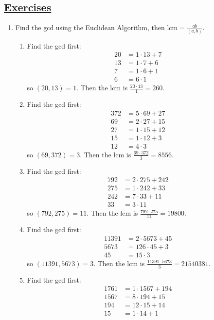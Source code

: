 \documentclass[]{article}
\begin{document}
\subsection*{\underline{Exercises}}
\begin{enumerate}
\item Find the gcd using the Euclidean Algorithm, then $\text{lcm} = \frac{ab}{(a,b)}$.
\begin{enumerate}
\item Find the gcd first:
\begin{align}
20 &= 1\cdot 13 + 7 \\
13 &= 1\cdot 7 + 6 \\
7 &= 1\cdot 6 + 1\\
6 &= 6\cdot 1
\end{align}
so $(20,13) = 1$. Then the lcm is $\frac{20\cdot 13}{1} = 260$.
\item Find the gcd first:
\begin{align}
372 &= 5\cdot 69 + 27 \\
69 &= 2\cdot 27 + 15 \\
27 &= 1\cdot 15 + 12 \\
15 &= 1\cdot 12 + 3\\
12 &= 4\cdot 3
\end{align}
so $(69,372) = 3$. Then the lcm is $\frac{69\cdot372}{3} = 8556$.
\item Find the gcd first:
\begin{align}
792 &= 2\cdot 275 + 242 \\
275 &= 1\cdot 242 + 33 \\
242 &= 7\cdot 33 + 11 \\
33 &= 3\cdot 11
\end{align}
so $(792,275) = 11$. Then the lcm is $\frac{792\cdot 275}{11} = 19800$.
\item Find the gcd first:
\begin{align}
11391 &= 2\cdot 5673 + 45 \\
5673 &= 126\cdot 45 + 3\\
45 &= 15\cdot 3
\end{align}
so $(11391,5673) = 3$. Then the lcm is $\frac{11391\cdot 5673}{3} = 21540381$.
\item Find the gcd first:
\begin{align}
1761 &= 1\cdot 1567 + 194 \\
1567 &= 8\cdot 194 + 15\\
194 &= 12\cdot 15 + 14\\
15 &= 1\cdot 14 + 1\\

\end{align}
\end{enumerate}
\end{enumerate}
\end{document}
